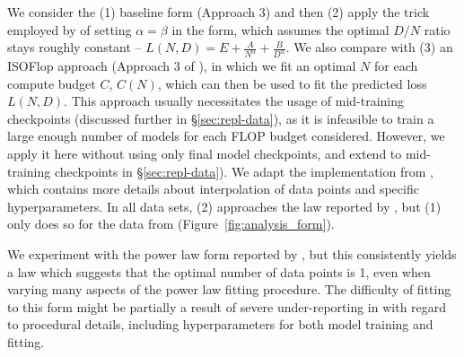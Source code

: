 We consider the (1) baseline \citet{hoffmann2022training} form (Approach 3) and then (2) apply the trick employed by \citet{muennighoff2024scaling} of setting $\alpha = \beta$ in the \citet{hoffmann2022training} form, which assumes the optimal $D/N$ ratio stays roughly constant -- $L(N, D) = E + \frac{A}{N^\alpha} + \frac{B}{D^\alpha}$. We also compare with (3) an ISOFlop approach (Approach 3 of \citet{hoffmann2022training}), in which we fit an optimal $N$ for each compute budget $C$, $C(N)$, which can then be used to fit the predicted loss $L(N, D)$. This approach usually necessitates the usage of mid-training checkpoints (discussed further in \S\ref{sec:repl-data}), as it is infeasible to train a large enough number of models for each FLOP budget considered. However, we apply it here without using only final model checkpoints, and extend to mid-training checkpoints in \S\ref{sec:repl-data}). We adapt the implementation from \citet{porian2024resolving}, which contains more details about interpolation of data points and specific hyperparameters. In all data sets, (2) approaches the law reported by \citet{hoffmann2022training}, but (1) only does so for the data from \citet{porian2024resolving}(Figure~\ref{fig:analysis_form}).

We experiment with the power law form reported by \citet{kaplan2020scaling}, but this consistently yields a law which suggests that the optimal number of data points is 1, even when varying many aspects of the power law fitting procedure. The difficulty of fitting to this form might be partially a result of severe under-reporting in \citet{kaplan2020scaling} with regard to procedural details, including hyperparameters for both model training and fitting. 


